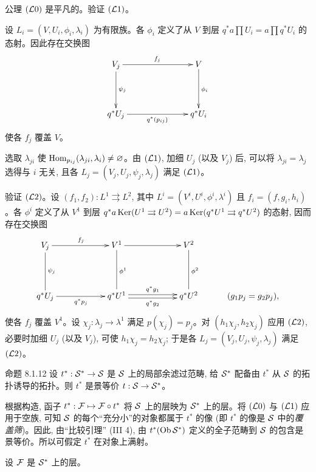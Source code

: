 公理 $({\mathcal L}0)$ 是平凡的。验证 $({\mathcal L}1)$。

设 $L_i=(V,U_i,\phi_i,\lambda_i)$ 为有限族。各 $\phi_i$ 定义了从 $V$ 到层 $q^{\ast}a\prod U_i=a\prod q^{\ast}U_i$ 的态射。因此存在交换图
\[
\xymatrix@C=2.5cm@R=1.5cm{
V_j \ar[r]^{f_j}\ar[d]^{\psi_j}&V\ar[d]^{\phi_i}\\
q^{\ast}U_j\ar[r]_{q^{\ast}(p_{ij})}&q^{\ast}U_i
}
\]
使\pageoriginale 各 $f_j$ 覆盖 $V$。

选取 $\lambda_{ji}$ 使 $\operatorname{Hom}_{p_{ij}}(\lambda_{ji},\lambda_i)\neq\varnothing$。由 $({\mathcal L}1)$, 加细 $U_j$ (以及 $V_j$) 后, 可以将 $\lambda_{ji}=\lambda_j$ 选得与 $i$ 无关, 且各 $L_j=(V_j,U_j,\psi_j,\lambda_j)$ 满足 $({\mathcal L}1)$。

验证 $({\mathcal L}2)$。设 $(f_1,f_2):L^1\rightrightarrows L^2$, 其中 $L^i=(V^i,U^i,\phi^i,\lambda^i)$ 且 $f_i=(f,g_i,h_i)$。各 $\phi^i$ 定义了从 $V^1$ 到层 $q^{\ast}a\operatorname{Ker}(U^1\rightrightarrows U^2)
=a\operatorname{Ker}(q^{\ast}U^1\rightrightarrows q^{\ast}U^2)$ 的态射, 因而存在交换图
\[
\xymatrix@C=2cm@R=1.5cm{
V_j \ar[r]^{f_j}\ar@{-}[d]^{\psi_j}&
V^1\ar[r]\ar@{-}[d]^{\phi^1}&V^2\ar@{-}[d]^{\phi^2}\\
q^{\ast}U_j\ar[r]_{q^{\ast}p_j}&q^{\ast}U^1
\ar@<2pt>[r]^{q^{\ast}g_1}\ar@<-2pt>[r]_{q^{\ast}g_2}&
q^{\ast}U^2&\kern-1cm(g_1p_j=g_2p_j),
}
\]
使各 $f_j$ 覆盖 $V^1$。设 $\chi_j:\lambda_j\to\lambda^1$ 满足 $p(\chi_j)=p_j$。对 $(h_1\chi_j,h_2\chi_j)$ 应用 $({\mathcal L}2)$, 必要时加细 $U_j$ (以及 $V_j$), 可使 $h_1\chi_j=h_2\chi_j$; 于是各 $L_j=(V_j,U_j,\psi_j,\lambda_j)$ 满足 $({\mathcal L}2)$。

\begin{enonce*}{命题 8.1.12}
设 $t^{\ast}:\Ss^{\ast}\to\Ss$ 是 ${\mathcal S}$ 上的局部余滤过范畴, 给 ${\mathcal S}^{\ast}$ 配备由 $t^{\ast}$ 从 ${\mathcal S}$ 的拓扑诱导的拓扑。则 $t^{\ast}$ 是景等价 $t:\Ss\to\Ss^{\ast}$。
\end{enonce*}

根据构造, 函子 $t^\ast:{\mathcal F}\mapsto{\mathcal F}\circ t^{\ast}$ 将 ${\mathcal S}$ 上的层映为 ${\mathcal S}^{\ast}$ 上的层。将 $({\mathcal L}0)$ 与 $({\mathcal L}1)$ 应用于空族, 可知 ${\mathcal S}$ 的每个“充分小”的对象都属于 $t^{\ast}$ 的像 (即 $t^{\ast}$ 的像是 ${\mathcal S}$ 中的\emph{覆盖筛})。因此, 由“比较引理” (III 4), 由 $t^{\ast}(\operatorname{Ob}{\mathcal S}^{\ast})$ 定义的全子范畴到 ${\mathcal S}$ 的包含是景等价。所以可假定 $t^{\ast}$ 在对象上满射。

设 ${\mathcal F}$ 是 ${\mathcal S}^{\ast}$ 上的层。


